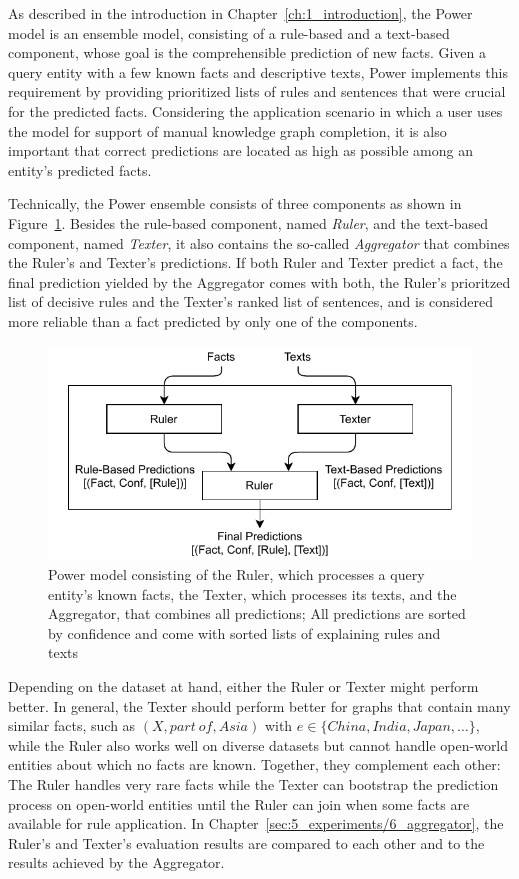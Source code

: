 As described in the introduction in Chapter~\ref{ch:1_introduction}, the Power model is an ensemble model, consisting of a rule-based and a text-based component, whose goal is the comprehensible prediction of new facts. Given a query entity with a few known facts and descriptive texts, Power implements this requirement by providing prioritized lists of rules and sentences that were crucial for the predicted facts. Considering the application scenario in which a user uses the model for support of manual knowledge graph completion, it is also important that correct predictions are located as high as possible among an entity's predicted facts.

Technically, the Power ensemble consists of three components as shown in Figure~\ref{fig:4_approach/power_architecture}. Besides the rule-based component, named \emph{Ruler}, and the text-based component, named \emph{Texter}, it also contains the so-called \emph{Aggregator} that combines the Ruler's and Texter's predictions. If both Ruler and Texter predict a fact, the final prediction yielded by the Aggregator comes with both, the Ruler's prioritzed list of decisive rules and the Texter's ranked list of sentences, and is considered more reliable than a fact predicted by only one of the components.

\begin{figure}[t]
    \centering
    \includegraphics[width=\textwidth]{4_approach/power_architecture}
    \caption{Power model consisting of the Ruler, which processes a query entity's known facts, the Texter, which processes its texts, and the Aggregator, that combines all predictions; All predictions are sorted by confidence and come with sorted lists of explaining rules and texts}
    \label{fig:4_approach/power_architecture}
\end{figure}

Depending on the dataset at hand, either the Ruler or Texter might perform better. In general, the Texter should perform better for graphs that contain many similar facts, such as $(X, part~of, Asia)$ with $e \in \{China, India, Japan, \dots\}$, while the Ruler also works well on diverse datasets but cannot handle open-world entities about which no facts are known. Together, they complement each other: The Ruler handles very rare facts while the Texter can bootstrap the prediction process on open-world entities until the Ruler can join when some facts are available for rule application. In Chapter~\ref{sec:5_experiments/6_aggregator}, the Ruler's and Texter's evaluation results are compared to each other and to the results achieved by the Aggregator.

